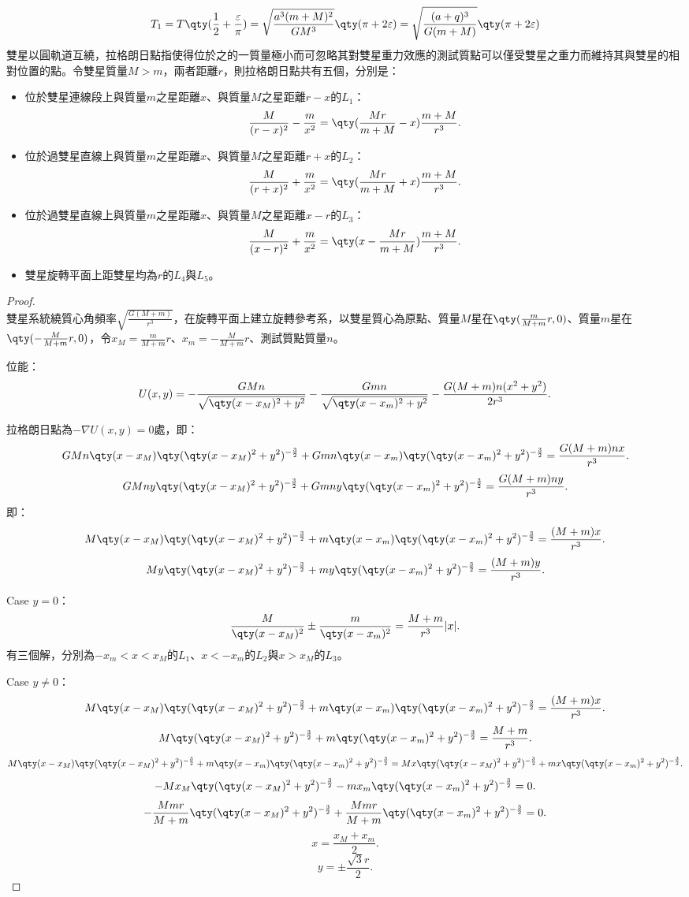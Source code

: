 \documentclass[a4paper,12pt]{article}
\begin{document}
\[T_1=T\qty(\frac{1}{2}+\frac{\varepsilon}{\pi})=\sqrt{\frac{a^3(m+M)^2}{GM^3}}\qty(\pi+2\varepsilon)=\sqrt{\frac{(a+q)^3}{G(m+M)}}\qty(\pi+2\varepsilon)\]
雙星以圓軌道互繞，拉格朗日點指使得位於之的一質量極小而可忽略其對雙星重力效應的測試質點可以僅受雙星之重力而維持其與雙星的相對位置的點。令雙星質量$M>m$，兩者距離$r$，則拉格朗日點共有五個，分別是：
\begin{itemize}
\item 位於雙星連線段上與質量$m$之星距離$x$、與質量$M$之星距離$r-x$的$L_1$：
\[\frac{M}{(r-x)^2}-\frac{m}{x^2}=\qty(\frac{Mr}{m+M}-x)\frac{m+M}{r^3}.\]
\item 位於過雙星直線上與質量$m$之星距離$x$、與質量$M$之星距離$r+x$的$L_2$：
\[\frac{M}{(r+x)^2}+\frac{m}{x^2}=\qty(\frac{Mr}{m+M}+x)\frac{m+M}{r^3}.\]
\item 位於過雙星直線上與質量$m$之星距離$x$、與質量$M$之星距離$x-r$的$L_3$：
\[\frac{M}{(x-r)^2}+\frac{m}{x^2}=\qty(x-\frac{Mr}{m+M})\frac{m+M}{r^3}.\]
\item 雙星旋轉平面上距雙星均為$r$的$L_4$與$L_5$。
\end{itemize}
\begin{proof}\mbox{}\\
雙星系統繞質心角頻率$\sqrt{\frac{G(M+m)}{r^3}}$，在旋轉平面上建立旋轉參考系，以雙星質心為原點、質量$M$星在$\qty(\frac{m}{M+m}r,0)$、質量$m$星在$\qty(-\frac{M}{M+m}r,0)$，令$x_M=\frac{m}{M+m}r$、$x_m=-\frac{M}{M+m}r$、測試質點質量$n$。

位能：
\[U(x,y)=-\frac{GMn}{\sqrt{\qty(x-x_M)^2+y^2}}-\frac{Gmn}{\sqrt{\qty(x-x_m)^2+y^2}}-\frac{G(M+m)n(x^2+y^2)}{2r^3}.\]

拉格朗日點為$-\nabla U(x,y)=0$處，即：
\[GMn\qty(x-x_M)\qty(\qty(x-x_M)^2+y^2)^{-\frac{3}{2}}+Gmn\qty(x-x_m)\qty(\qty(x-x_m)^2+y^2)^{-\frac{3}{2}}=\frac{G(M+m)nx}{r^3}.\]
\[GMny\qty(\qty(x-x_M)^2+y^2)^{-\frac{3}{2}}+Gmny\qty(\qty(x-x_m)^2+y^2)^{-\frac{3}{2}}=\frac{G(M+m)ny}{r^3}.\]
即：
\[M\qty(x-x_M)\qty(\qty(x-x_M)^2+y^2)^{-\frac{3}{2}}+m\qty(x-x_m)\qty(\qty(x-x_m)^2+y^2)^{-\frac{3}{2}}=\frac{(M+m)x}{r^3}.\]
\[My\qty(\qty(x-x_M)^2+y^2)^{-\frac{3}{2}}+my\qty(\qty(x-x_m)^2+y^2)^{-\frac{3}{2}}=\frac{(M+m)y}{r^3}.\]

Case $y=0$：
\[\frac{M}{\qty(x-x_M)^2}\pm\frac{m}{\qty(x-x_m)^2}=\frac{M+m}{r^3}|x|.\]
有三個解，分別為$-x_m<x<x_M$的$L_1$、$x<-x_m$的$L_2$與$x>x_M$的$L_3$。

Case $y\neq 0$：
\[M\qty(x-x_M)\qty(\qty(x-x_M)^2+y^2)^{-\frac{3}{2}}+m\qty(x-x_m)\qty(\qty(x-x_m)^2+y^2)^{-\frac{3}{2}}=\frac{(M+m)x}{r^3}.\]
\[M\qty(\qty(x-x_M)^2+y^2)^{-\frac{3}{2}}+m\qty(\qty(x-x_m)^2+y^2)^{-\frac{3}{2}}=\frac{M+m}{r^3}.\]
\[M\qty(x-x_M)\qty(\qty(x-x_M)^2+y^2)^{-\frac{3}{2}}+m\qty(x-x_m)\qty(\qty(x-x_m)^2+y^2)^{-\frac{3}{2}}=Mx\qty(\qty(x-x_M)^2+y^2)^{-\frac{3}{2}}+mx\qty(\qty(x-x_m)^2+y^2)^{-\frac{3}{2}}.\]
\[-Mx_M\qty(\qty(x-x_M)^2+y^2)^{-\frac{3}{2}}-mx_m\qty(\qty(x-x_m)^2+y^2)^{-\frac{3}{2}}=0.\]
\[-\frac{Mmr}{M+m}\qty(\qty(x-x_M)^2+y^2)^{-\frac{3}{2}}+\frac{Mmr}{M+m}\qty(\qty(x-x_m)^2+y^2)^{-\frac{3}{2}}=0.\]
\[x=\frac{x_M+x_m}{2}.\]
\[y=\pm\frac{\sqrt{3}r}{2}.\]
\end{proof}
\end{document}
